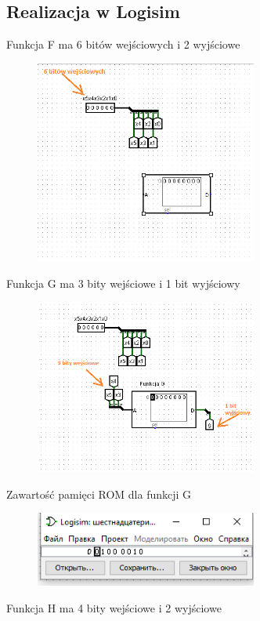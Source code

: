\documentclass[]{article}
\begin{document}
\subsection{Realizacja w Logisim}
Funkcja F ma 6 bitów wejściowych i 2 wyjściowe
\begin{figure}[H]
	\centering
	\includegraphics[width=0.65\textwidth]{1.1.png}
\end{figure}
Funkcja G ma 3 bity wejściowe i 1 bit wyjściowy
\begin{figure}[H]
	\centering
	\includegraphics[width=0.65\textwidth]{1.2.png}
\end{figure}
\newpage
Zawartość pamięci ROM dla funkcji G
\begin{figure}[H]
	\includegraphics[width=0.65\textwidth]{1.3.png}
\end{figure}
Funkcja H ma 4 bity wejściowe i 2 wyjściowe
\end{document}
